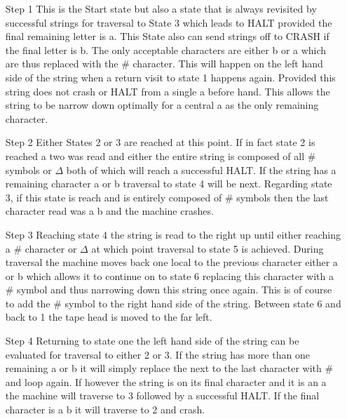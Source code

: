 \documentclass[10pt]{report}
\begin{document}
\begin{enumerate}
\item[Step 1] This is the Start state but also a state that is always revisited by successful strings for traversal to State 3 which leads to HALT provided the final remaining letter is a. This State also can send strings off to CRASH if the final letter is b. The only acceptable characters are either b or a which are thus replaced with the \# character. This will happen on the left hand side of the string when a return visit to state 1 happens again. Provided this string does not crash or HALT from a single a before hand. This allows the string to be narrow down optimally for a central a as the only remaining character.
\item [Step 2] Either States 2 or 3 are reached at this point. If in fact state 2 is reached a two was read and either the entire string is composed of all \# symbols or $\Delta$ both of which will reach a successful HALT. If the string has a remaining character a or b traversal to state 4 will be next. Regarding state 3, if this state is reach and is entirely composed of \# symbols then the last character read was a b and the machine crashes. 
\item[Step 3] Reaching state 4 the string is read to the right up until either reaching a \# character or $\Delta$ at which point traversal to state 5 is achieved. During traversal the machine moves back one local to the previous character either a or b which allows it to continue on to state 6  replacing this character with a \# symbol and thus narrowing down this string once again. This is of course to add the \# symbol to the right hand side of the string. Between state 6 and back to 1 the tape head is moved to the far left.
\item[Step 4] 
Returning to state one the left hand side of the string can be evaluated for traversal to either 2 or 3. If the string has more than one remaining a or b it will simply replace the next to the last character with \# and loop again. If however the string is on its final character and it is an a the machine will traverse to 3 followed by a successful HALT. If the final character is a b it will traverse to 2 and crash.

\end{enumerate}
\end{document}
